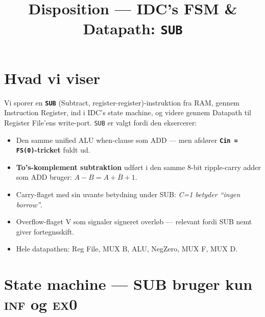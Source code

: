 \documentclass[11pt,a4paper]{article}
\title{\vspace{-1em}\textcolor{accent}{\Large Disposition --- IDC's FSM \& Datapath: \texttt{SUB}}}
\author{}
\date{}
\begin{document}
\maketitle
\vspace{-3em}

\section*{Hvad vi viser}

Vi sporer en \textbf{\texttt{SUB}} (Subtract, register-register)-instruktion
fra RAM, gennem Instruction Register, ind i IDC's state machine,
og videre gennem Datapath til Register File'ens write-port.
\texttt{SUB} er valgt fordi den eksercerer:

\begin{itemize}
  \item Den samme unified ALU when-clause som ADD --- men afslører \textbf{\texttt{Cin = FS(0)}-tricket} fuldt ud.
  \item \textbf{To's-komplement subtraktion} udført i den samme 8-bit ripple-carry adder som ADD bruger:
        $A - B = A + \overline{B} + 1$.
  \item Carry-flaget med sin uvante betydning under SUB: \emph{C=1 betyder ``ingen borrow''}.
  \item Overflow-flaget V som signaler signeret overløb --- relevant fordi SUB nemt giver fortegnsskift.
  \item Hele datapathen: Reg File, MUX B, ALU, NegZero, MUX F, MUX D.
\end{itemize}

\section*{State machine --- SUB bruger kun \textsc{inf} og \textsc{ex0}}

\begin{center}
\end{center}
\end{document}
